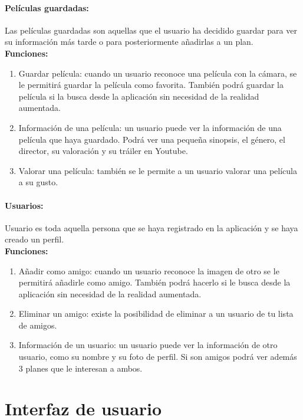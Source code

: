 \paragraph{\large Películas guardadas:\\}

Las películas guardadas son aquellas que el usuario ha decidido guardar para ver su información más tarde o para posteriormente añadirlas a un plan.
\\
\textbf{Funciones:}
\begin{enumerate}
    \item Guardar película: cuando un usuario reconoce una película con la cámara, se le permitirá guardar la película como favorita. También podrá guardar la película si la busca desde la aplicación sin necesidad de la realidad aumentada.
    \item Información de una película: un usuario puede ver la información de una película que haya guardado. Podrá ver una pequeña sinopsis, el género, el director, su valoración y su tráiler en Youtube.
    \item Valorar una película: también se le permite a un usuario valorar una película a su gusto.
\end{enumerate} 
\paragraph{\large Usuarios:\\}
Usuario es toda aquella persona que se haya registrado en la aplicación y se haya creado un perfil.
\\
\textbf{Funciones:}
\begin{enumerate}
    \item Añadir como amigo: cuando un usuario reconoce la imagen de otro se le permitirá añadirle como amigo. También podrá hacerlo si le busca desde la aplicación sin necesidad de la realidad aumentada.
    \item Eliminar un amigo: existe la posibilidad de eliminar a un usuario de tu lista de amigos.
    \item Información de un usuario: un usuario puede ver la información de otro usuario, como su nombre y su foto de perfil. Si son amigos podrá ver además 3 planes que le interesan a ambos.
\end{enumerate} 

\section{Interfaz de usuario}
\label{makereference3.4}

